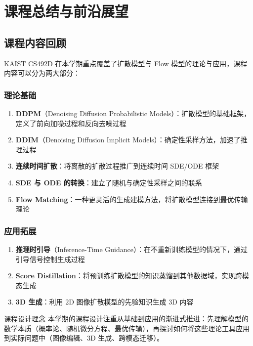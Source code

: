 \section{课程总结与前沿展望}

\subsection{课程内容回顾}

KAIST CS492D 在本学期重点覆盖了扩散模型与 Flow 模型的理论与应用，课程内容可以分为两大部分：

\subsubsection{理论基础}

\begin{enumerate}
    \item \textbf{DDPM}（Denoising Diffusion Probabilistic Models）：扩散模型的基础框架，定义了前向加噪过程和反向去噪过程
    \item \textbf{DDIM}（Denoising Diffusion Implicit Models）：确定性采样方法，加速了推理过程
    \item \textbf{连续时间扩散}：将离散的扩散过程推广到连续时间 SDE/ODE 框架
    \item \textbf{SDE 与 ODE 的转换}：建立了随机与确定性采样之间的联系
    \item \textbf{Flow Matching}：一种更灵活的生成建模方法，将扩散模型连接到最优传输理论
\end{enumerate}

\subsubsection{应用拓展}

\begin{enumerate}
    \item \textbf{推理时引导}（Inference-Time Guidance）：在不重新训练模型的情况下，通过引导信号控制生成过程
    \item \textbf{Score Distillation}：将预训练扩散模型的知识蒸馏到其他数据域，实现跨模态生成
    \item \textbf{3D 生成}：利用 2D 图像扩散模型的先验知识生成 3D 内容
\end{enumerate}

\begin{importantbox}{课程设计理念}
本学期的课程设计注重从基础到应用的渐进式推进：先理解模型的数学本质（概率论、随机微分方程、最优传输），再探讨如何将这些理论工具应用到实际问题中（图像编辑、3D 生成、跨模态迁移）。
\end{importantbox}

